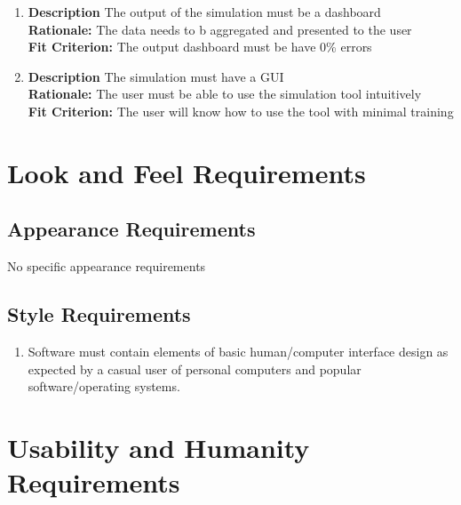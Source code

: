 \documentclass[paper=letter, fontsize=10pt]{scrartcl}
\numberwithin{equation}{section}		%
\numberwithin{figure}{section}			%
\numberwithin{table}{section}				%
\begin{document}
\begin{enumerate}
	\item \textbf{Description} The output of the simulation must be a dashboard
	\\ \textbf{Rationale:} The data needs to b aggregated and presented to the user
	\\ \textbf{Fit Criterion:} The output dashboard must be have 0\% errors
	\item \textbf{Description} The simulation must have a GUI
	\\ \textbf{Rationale:} The user must be able to use the simulation tool intuitively  
	\\ \textbf{Fit Criterion:} The user will know how to use the tool with minimal training
\end{enumerate}

\section{Look and Feel Requirements}
\subsection{Appearance Requirements}
No specific appearance requirements
\subsection{Style Requirements}
\begin{enumerate}
	\item Software must contain elements of basic human/computer interface design as expected by a casual user of personal computers and popular software/operating systems.
\end{enumerate}

\section{Usability and Humanity Requirements}
\end{document}
